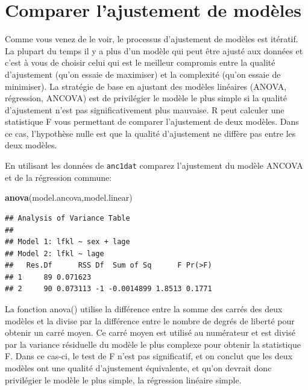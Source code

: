 \documentclass[
  12pt,
]{book}
\makeatletter
\newenvironment{Shaded}{\begin{snugshade}}{\end{snugshade}}
\newcommand{\KeywordTok}[1]{\textcolor[rgb]{0.13,0.29,0.53}{\textbf{#1}}}
\newcommand{\NormalTok}[1]{#1}
\newenvironment{kframe}{%
\medskip{}
\setlength{\fboxsep}{.8em}
\def\at@end@of@kframe{}%
\ifinner\ifhmode%
 \def\at@end@of@kframe{\end{minipage}}%
 \begin{minipage}{\columnwidth}%
\fi\fi%
\def\FrameCommand##1{\hskip\@totalleftmargin \hskip-\fboxsep
\colorbox{incolor}{##1}\hskip-\fboxsep
    \hskip-\linewidth \hskip-\@totalleftmargin \hskip\columnwidth}%
\MakeFramed {\advance\hsize-\width
  \@totalleftmargin\z@ \linewidth\hsize
  \@setminipage}}%
{\par\unskip\endMakeFramed%
\at@end@of@kframe}
\newenvironment{rmdblock}[1]
 {
 \begin{itemize}
 \renewcommand{\labelitemi}{
   \raisebox{-.7\height}[0pt][0pt]{
     {\setkeys{Gin}{width=3em,keepaspectratio}\texttt{[image: images/\#1]}}
   }
 }
 \begin{kframe}
 \setlength{\fboxsep}{1em}
 \item
 }
 {
 \end{kframe}
 \end{itemize}
 }
\newenvironment{rmdcode}
  {\begin{rmdblock}{screen}}
  {\end{rmdblock}}
\makeatother
\begin{document}
\hypertarget{comparer-lajustement-de-moduxe8les}{%
\section{Comparer l'ajustement de modèles}\label{comparer-lajustement-de-moduxe8les}}

Comme vous venez de le voir, le processus d'ajustement de modèles est itératif. La plupart du temps il y a plus d'un modèle qui peut être ajusté aux données et c'est à vous de choisir celui qui est le meilleur compromis entre la qualité d'ajustement (qu'on essaie de maximiser) et la complexité (qu'on essaie de minimiser). La stratégie de base en ajustant des modèles linéaires (ANOVA, régression, ANCOVA) est de privilégier le modèle le plus simple si la qualité d'ajustement n'est pas significativement plus mauvaise. R peut calculer une statistique F vous permettant de comparer l'ajustement de deux modèles. Dans ce cas, l'hypothèse nulle est que la qualité d'ajustement ne diffère pas entre les deux modèles.

\begin{rmdcode}
En utilisant les données de \texttt{anc1dat} comparez l'ajustement du modèle ANCOVA et de la régression commune:
\end{rmdcode}

\begin{Shaded}
\begin{Highlighting}[]
\KeywordTok{anova}\NormalTok{(model.ancova,model.linear)}
\end{Highlighting}
\end{Shaded}

\begin{verbatim}
## Analysis of Variance Table
## 
## Model 1: lfkl ~ sex + lage
## Model 2: lfkl ~ lage
##   Res.Df      RSS Df  Sum of Sq      F Pr(>F)
## 1     89 0.071623                            
## 2     90 0.073113 -1 -0.0014899 1.8513 0.1771
\end{verbatim}

La fonction anova() utilise la différence entre la somme des carrés des deux modèles et la divise par la différence entre le nombre de degrés de liberté pour obtenir un carré moyen. Ce carré moyen est utilisé au numérateur et est divisé par la variance résiduelle du modèle le plus complexe pour obtenir la statistique F. Dans ce cas-ci, le test de F n'est pas significatif, et on conclut que les deux modèles ont une qualité d'ajustement équivalente, et qu'on devrait donc privilégier le modèle le plus simple, la régression linéaire simple.
\end{document}
